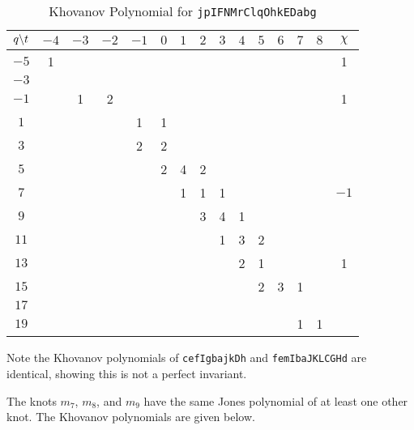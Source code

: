 \documentclass{article}
\theoremstyle{plain}
\begin{document}
        \begin{table}[H]
            \centering
            \begin{tabular}{| c | c | c | c | c | c | c | c | c | c | c | c | c | c | c |}
                \hline
                $q\symbol{92}t$&$-4$&$-3$&$-2$&$-1$&$0$&$1$&$2$&$3$&$4$&$5$&$6$&$7$&$8$&$\chi$\\
                \hline
                $-5$&1&&&&&&&&&&&&&1\\
                \hline
                $-3$&&&&&&&&&&&&&&\\
                \hline
                $-1$&&1&2&&&&&&&&&&&1\\
                \hline
                $1$&&&&1&1&&&&&&&&&\\
                \hline
                $3$&&&&2&2&&&&&&&&&\\
                \hline
                $5$&&&&&2&4&2&&&&&&&\\
                \hline
                $7$&&&&&&1&1&1&&&&&&$-1$\\
                \hline
                $9$&&&&&&&3&4&1&&&&&\\
                \hline
                $11$&&&&&&&&1&3&2&&&&\\
                \hline
                $13$&&&&&&&&&2&1&&&&1\\
                \hline
                $15$&&&&&&&&&&2&3&1&&\\
                \hline
                $17$&&&&&&&&&&&&&&\\
                \hline
                $19$&&&&&&&&&&&&1&1&\\
                \hline
            \end{tabular}
            \caption{Khovanov Polynomial for \texttt{jpIFNMrClqOhkEDabg}}
            \label{table:jpIFNMrClqOhkEDabg_kho}
        \end{table}
        Note the Khovanov polynomials of \texttt{cefIgbajkDh} and
        \texttt{femIbaJKLCGHd} are identical, showing this is not a perfect
        invariant.
        \par\hfill\par
        The knots $m_{7}$, $m_{8}$, and $m_{9}$ have the same Jones polynomial
        of at least one other knot. The Khovanov polynomials are given below.
\end{document}
